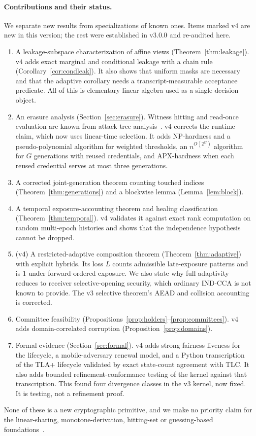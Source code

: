 \documentclass[pdflatex,sn-mathphys-num]{sn-jnl}
\theoremstyle{plain}
\theoremstyle{definition}
\begin{document}
\paragraph{Contributions and their status.}
We separate new results from specializations of known ones. Items marked v4 are new in this version; the rest were established in v3.0.0 and re-audited here.
\begin{enumerate}
\item A leakage-subspace characterization of affine views (Theorem~\ref{thm:leakage}). v4 adds exact marginal and conditional leakage with a chain rule (Corollary~\ref{cor:condleak}). It also shows that uniform masks are necessary and that the adaptive corollary needs a transcript-measurable acceptance predicate. All of this is elementary linear algebra used as a single decision object.
\item An erasure analysis (Section~\ref{sec:erasure}). Witness hitting and read-once evaluation are known from attack-tree analysis~\cite{mauw2005,lopuhaa2022}. v4 corrects the runtime claim, which now uses linear-time selection. It adds NP-hardness and a pseudo-polynomial algorithm for weighted thresholds, an $n^{O(2^G)}$ algorithm for $G$ generations with reused credentials, and APX-hardness when each reused credential serves at most three generations.
\item A corrected joint-generation theorem counting touched indices (Theorem~\ref{thm:generations}) and a blockwise lemma (Lemma~\ref{lem:block}).
\item A temporal exposure-accounting theorem and healing classification (Theorem~\ref{thm:temporal}). v4 validates it against exact rank computation on random multi-epoch histories and shows that the independence hypothesis cannot be dropped.
\item (v4) A restricted-adaptive composition theorem (Theorem~\ref{thm:adaptive}) with explicit hybrids. Its loss $L$ counts admissible late-exposure patterns and is $1$ under forward-ordered exposure. We also state why full adaptivity reduces to receiver selective-opening security, which ordinary IND-CCA is not known to provide. The v3 selective theorem's AEAD and collision accounting is corrected.
\item Committee feasibility (Propositions~\ref{prop:holders}--\ref{prop:committees}). v4 adds domain-correlated corruption (Proposition~\ref{prop:domains}).
\item Formal evidence (Section~\ref{sec:formal}). v4 adds strong-fairness liveness for the lifecycle, a mobile-adversary renewal model, and a Python transcription of the TLA+ lifecycle validated by exact state-count agreement with TLC. It also adds bounded refinement-conformance testing of the kernel against that transcription. This found four divergence classes in the v3 kernel, now fixed. It is testing, not a refinement proof.
\end{enumerate}
None of these is a new cryptographic primitive, and we make no priority claim for the linear-sharing, monotone-derivation, hitting-set or guessing-based foundations~\cite{karchmer1993,panjwani2007}.
\end{document}
